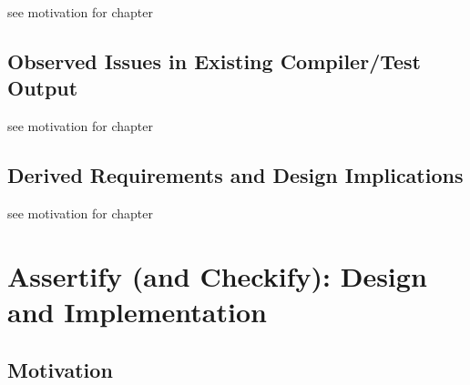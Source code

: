 \documentclass[
	bibliography=totoc,
	listof=totoc,
]{scrbook}
\begin{document}
\begin{marker}\begin{justify}
see motivation for chapter
\end{justify}\end{marker}


\section{Observed Issues in Existing Compiler/Test Output} %


\begin{marker}\begin{justify}
see motivation for chapter
\end{justify}\end{marker}


\section{Derived Requirements and Design Implications} %


\begin{marker}\begin{justify}
see motivation for chapter
\end{justify}\end{marker}


\pagebreak %
\chapter{Assertify (and Checkify): Design and Implementation} %
\section*{Motivation} %
\end{document}
